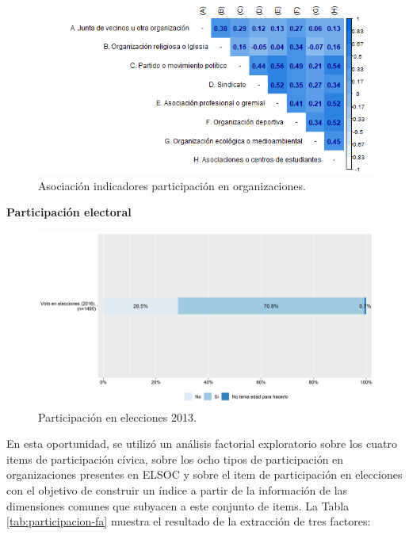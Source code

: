 \documentclass[
  12pt,
]{book}
\begin{document}
\begin{figure}[H]

{\centering \includegraphics[width=1\linewidth,height=1\textheight]{output/graphs/participacion-organizaciones_cor} 

}

\caption{Asociación indicadores participación en organizaciones.}\label{fig:participacion-organizaciones-cor}
\end{figure}

\textbf{Participación electoral}

\begin{figure}[H]

{\centering \includegraphics[width=1\linewidth,height=1\textheight]{output/graphs/participacion-electoral} 

}

\caption{Participación en elecciones 2013.}\label{fig:participacion-electoral}
\end{figure}

En esta oportunidad, se utilizó un análisis factorial exploratorio sobre los cuatro items de participación cívica, sobre los ocho tipos de participación en organizaciones presentes en ELSOC y sobre el item de participación en elecciones con el objetivo de construir un índice a partir de la información de las dimensiones comunes que subyacen a este conjunto de items. La Tabla \ref{tab:participacion-fa} muestra el resultado de la extracción de tres factores:
\end{document}
